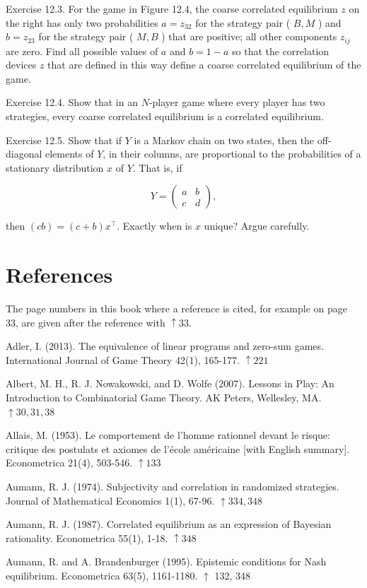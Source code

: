 \documentclass[12pt]{article}
\begin{document}
Exercise 12.3. For the game in Figure 12.4, the coarse correlated equilibrium $z$ on the right has only two probabilities $a=z_{32}$ for the strategy pair ( $B, M$ ) and $b=z_{23}$ for the strategy pair ( $M, B$ ) that are positive; all other components $z_{i j}$ are zero. Find all possible values of $a$ and $b=1-a$ so that the correlation devices $z$ that are defined in this way define a coarse correlated equilibrium of the game.

Exercise 12.4. Show that in an $N$-player game where every player has two strategies, every coarse correlated equilibrium is a correlated equilibrium.

Exercise 12.5. Show that if $Y$ is a Markov chain on two states, then the off-diagonal elements of $Y$, in their columns, are proportional to the probabilities of a stationary distribution $x$ of $Y$. That is, if

$$
Y=\left(\begin{array}{ll}
a & b \\
c & d
\end{array}\right),
$$

then $(c b)=(c+b) x^{\top}$. Exactly when is $x$ unique? Argue carefully.

\section*{References}
The page numbers in this book where a reference is cited, for example on page 33, are given after the reference with $\uparrow 33$.

Adler, I. (2013). The equivalence of linear programs and zero-sum games. International Journal of Game Theory 42(1), 165-177. $\uparrow 221$

Albert, M. H., R. J. Nowakowski, and D. Wolfe (2007). Lessons in Play: An Introduction to Combinatorial Game Theory. AK Peters, Wellesley, MA. $\uparrow 30,31,38$

Allais, M. (1953). Le comportement de l'homme rationnel devant le risque: critique des postulats et axiomes de l'école américaine [with English summary]. Econometrica 21(4), 503-546. $\uparrow 133$

Aumann, R. J. (1974). Subjectivity and correlation in randomized strategies. Journal of Mathematical Economics 1(1), 67-96. $\uparrow 334,348$

Aumann, R. J. (1987). Correlated equilibrium as an expression of Bayesian rationality. Econometrica 55(1), 1-18. $\uparrow 348$

Aumann, R. and A. Brandenburger (1995). Epistemic conditions for Nash equilibrium. Econometrica 63(5), 1161-1180. $\uparrow$ 132, 348
\end{document}
